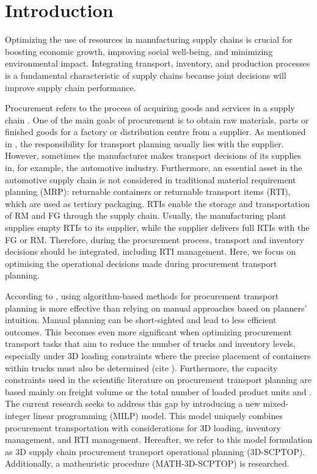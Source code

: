 \section{Introduction}

Optimizing the use of resources in manufacturing supply chains is crucial for boosting economic growth, improving social well-being, and minimizing environmental impact. Integrating transport, inventory, and production processes is a fundamental characteristic of supply chains \autocite{Stadtler2015SupplyPlanning} because joint decisions will improve supply chain performance\autocite{Diaz-Madronero2017ADecisions}.

Procurement refers to the process of acquiring goods and services in a supply chain \autocite{Chopra2015SupplyOperation}. One of the main goals of procurement is to obtain raw materials, parts or finished goods for a factory or distribution centre from a supplier. As mentioned in \autocite{Fleischmann2015TransportDistribution}, the responsibility for transport planning usually lies with the supplier. However, sometimes the manufacturer makes transport decisions of its supplies in, for example, the automotive industry. Furthermore, an essential asset in the automotive supply chain is not considered in traditional material requirement planning (MRP): returnable containers or returnable transport items (RTI), which are used as tertiary packaging. RTIs enable the storage and transportation of RM and FG through the supply chain. Usually, the manufacturing plant supplies empty RTIs to its supplier, while the supplier delivers full RTIs with the FG or RM. Therefore, during the procurement process, transport and inventory decisions should be integrated, including RTI management. Here, we focus on optimising the operational decisions made during procurement transport planning.

According to \autocite{Diaz-Madronero2014AChain}, using algorithm-based methods for procurement transport planning is more effective than relying on manual approaches based on planners' intuition. Manual planning can be short-sighted and lead to less efficient outcomes. This becomes even more significant when optimizing procurement transport tasks that aim to reduce the number of trucks and inventory levels, especially under 3D loading constraints where the precise placement of containers within trucks must also be determined (cite ).
Furthermore, the capacity constraints used in the scientific literature on procurement transport planning are based mainly on freight volume or the total number of loaded product units  {\autocite{Hashemi-Amiri2023IntegratedApproach} and \autocite{Diaz-Madronero2014AChain}.} The current research seeks to address this gap by introducing a new mixed-integer linear programming (MILP) model. This model uniquely combines procurement transportation with considerations for 3D loading, inventory management, and RTI management. Hereafter, we refer to this model formulation as 3D supply chain procurement transport operational planning (3D-SCPTOP). Additionally,  a matheuristic procedure (MATH-3D-SCPTOP)  is researched.



